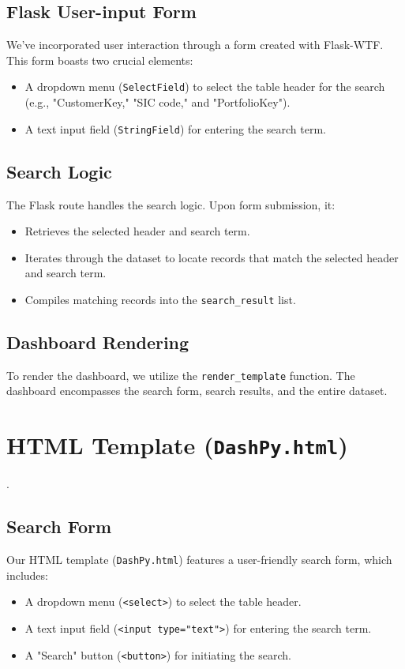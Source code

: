 \documentclass{article}
\begin{document}
	\subsection{Flask User-input Form}
	We've incorporated user interaction through a form created with Flask-WTF. This form boasts two crucial elements:
	\begin{itemize}
		\item A dropdown menu (\texttt{SelectField}) to select the table header for the search (e.g., "CustomerKey," "SIC code," and "PortfolioKey").
		\item A text input field (\texttt{StringField}) for entering the search term.
	\end{itemize}
	
	\subsection{Search Logic}
	The Flask route handles the search logic. Upon form submission, it:
	\begin{itemize}
		\item Retrieves the selected header and search term.
		\item Iterates through the dataset to locate records that match the selected header and search term.
		\item Compiles matching records into the \texttt{search\_result} list.
	\end{itemize}
	
	\subsection{Dashboard Rendering}
	To render the dashboard, we utilize the \texttt{render\_template} function. The dashboard encompasses the search form, search results, and the entire dataset.
	
	\section{HTML Template (\texttt{DashPy.html})}
	\label{DashHTML}.
	\subsection{Search Form}
	Our HTML template (\texttt{DashPy.html}) features a user-friendly search form, which includes:
	\begin{itemize}
		\item A dropdown menu (\texttt{<select>}) to select the table header.
		\item A text input field (\texttt{<input type="text">}) for entering the search term.
		\item A "Search" button (\texttt{<button>}) for initiating the search.
	\end{itemize}
	
\end{document}
